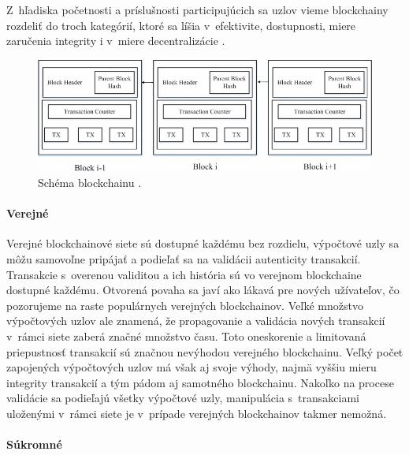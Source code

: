 Z~hľadiska početnosti a príslušnosti participujúcich sa uzlov vieme blockchainy rozdeliť do troch kategórií, ktoré sa líšia v~efektivite, dostupnosti, miere zaručenia integrity i v~miere decentralizácie \cite{blockchain_architecture1}.

\begin{figure}[hbt]
	\centering
	\includegraphics[width=\textwidth]{obrazky-figures/blockchain_scheme.png}
	\caption{Schéma blockchainu \cite{blockchain_architecture1}.}
	\label{pic_blockchain_scheme}
\end{figure}

\paragraph{Verejné}

Verejné blockchainové siete sú dostupné každému bez rozdielu, výpočtové uzly sa môžu samovoľne pripájať a podieľať sa na validácii autenticity transakcií. Transakcie s~overenou validitou a ich história sú vo verejnom blockchaine dostupné každému. Otvorená povaha sa javí ako lákavá pre nových užívateľov, čo pozorujeme na raste populárnych verejných blockchainov. Veľké množstvo výpočtových uzlov ale znamená, že propagovanie a validácia nových transakcií v~rámci siete zaberá značné množstvo času. Toto oneskorenie a limitovaná priepustnosť transakcií sú značnou nevýhodou verejného blockchainu. Veľký počet zapojených výpočtových uzlov má však aj svoje výhody, najmä vyššiu mieru integrity transakcií a tým pádom aj samotného blockchainu. Nakoľko na procese validácie sa podieľajú všetky výpočtové uzly, manipulácia s~transakciami uloženými v~rámci siete je v~prípade verejných blockchainov takmer nemožná.

\paragraph{Súkromné}

